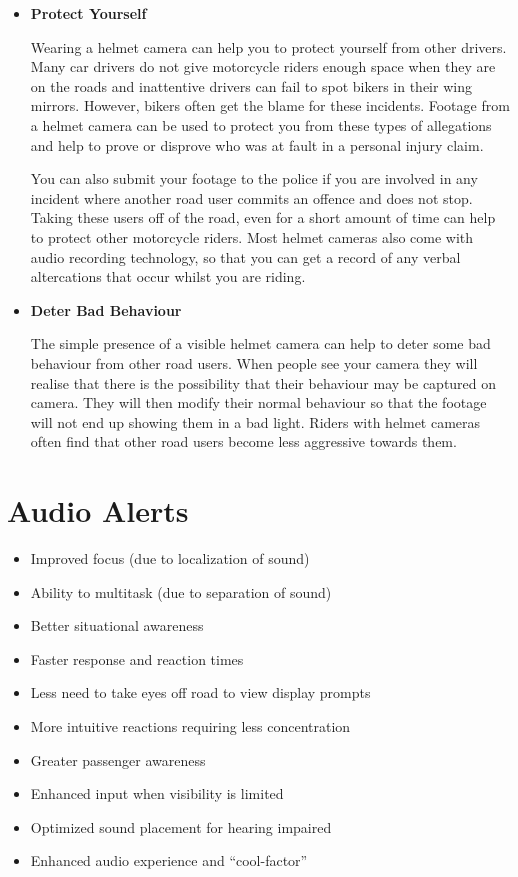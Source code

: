 \begin{itemize}
	\item \textbf{Protect Yourself}
	
	Wearing a helmet camera can help you to protect yourself from other drivers. Many car drivers do not give motorcycle riders enough space when they are on the roads and inattentive drivers can fail to spot bikers in their wing mirrors. However, bikers often get the blame for these incidents. Footage from a helmet camera can be used to protect you from these types of allegations and help to prove or disprove who was at fault in a personal injury claim.
	
	You can also submit your footage to the police if you are involved in any incident where another road user commits an offence and does not stop. Taking these users off of the road, even for a short amount of time can help to protect other motorcycle riders. Most helmet cameras also come with audio recording technology, so that you can get a record of any verbal altercations that occur whilst you are riding.
	
	\item \textbf{Deter Bad Behaviour}
	
	The simple presence of a visible helmet camera can help to deter some bad behaviour from other road users. When people see your camera they will realise that there is the possibility that their behaviour may be captured on camera. They will then modify their normal behaviour so that the footage will not end up showing them in a bad light. Riders with helmet cameras often find that other road users become less aggressive towards them.
\end{itemize}
\section{Audio Alerts }
\begin{itemize}
	\item Improved focus (due to localization of sound)
	\item Ability to multitask (due to separation of sound)
	\item Better situational awareness
	\item Faster response and reaction times
	\item Less need to take eyes off road to view display prompts
	\item More intuitive reactions requiring less concentration
	\item Greater passenger awareness
	\item Enhanced input when visibility is limited
	\item Optimized sound placement for hearing impaired
	\item Enhanced audio experience and “cool-factor”
\end{itemize}
